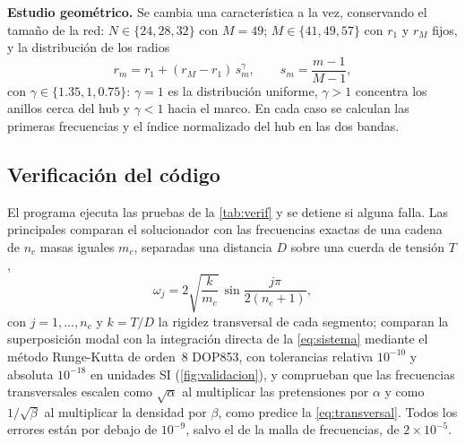 \documentclass[fleqn,final]{jaes}
\begin{document}
\textbf{Estudio geométrico.} Se cambia una característica a la vez,
conservando el tamaño de la red: $N\in\{24,28,32\}$ con $M=49$;
$M\in\{41,49,57\}$ con $r_1$ y $r_M$ fijos, y la distribución de los
radios
\begin{equation}
  r_m=r_1+(r_M-r_1)\,s_m^{\gamma},\qquad s_m=\frac{m-1}{M-1},
  \label{eq:gamma}
\end{equation}
con $\gamma\in\{1.35,1,0.75\}$: $\gamma=1$ es la distribución uniforme,
$\gamma>1$ concentra los anillos cerca del hub y $\gamma<1$ hacia el
marco. En cada caso se calculan las primeras frecuencias y el índice
normalizado del hub en las dos bandas.

\subsection{Verificación del código}\label{sec:verificacion}

El programa ejecuta las pruebas de la \cref{tab:verif} y se detiene si
alguna falla. Las principales comparan el solucionador con las
frecuencias exactas de una cadena de $n_c$ masas iguales $m_c$,
separadas una distancia $D$ sobre una cuerda de tensión $T$,
\begin{equation}
  \omega_j=2\sqrt{\frac{k}{m_c}}\,\sin\frac{j\pi}{2(n_c+1)},
  \label{eq:cuerda}
\end{equation}
con $j=1,\dots,n_c$ y $k=T/D$ la rigidez transversal de cada segmento; comparan la
superposición modal con la integración directa de la \cref{eq:sistema}
mediante el método Runge-Kutta de orden~8 DOP853, con tolerancias
relativa $10^{-10}$ y absoluta $10^{-18}$ en unidades SI
(\cref{fig:validacion}), y
comprueban que las frecuencias transversales escalen como $\sqrt\alpha$ al
multiplicar las pretensiones por $\alpha$ y como $1/\sqrt\beta$ al
multiplicar la densidad por $\beta$, como predice la
\cref{eq:transversal}. Todos los errores están por debajo de $10^{-9}$,
salvo el de la malla de frecuencias, de $2\times10^{-5}$.
\end{document}
